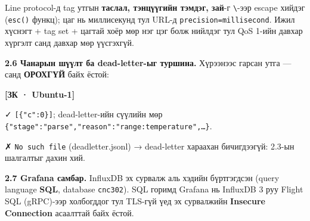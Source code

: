 Line protocol-д tag утгын \textbf{таслал, тэнцүүгийн тэмдэг, зай}-г \texttt{\textbackslash{}}-ээр escape хийдэг (\texttt{esc()} функц); цаг нь миллисекунд тул URL-д \texttt{precision=\allowbreak{}millisecond}. Ижил хүснэгт + tag set + цагтай хоёр мөр нэг цэг болж нийлдэг тул QoS 1-ийн давхар хүргэлт санд давхар мөр үүсгэхгүй.

\textbf{2.6 Чанарын шүүлт ба dead-letter-ыг туршина.} Хүрээнээс гарсан утга --- санд \textbf{ОРОХГҮЙ} байх ёстой:

\textbf{{[}ЗК · Ubuntu-1{]}}

\begin{Shaded}
\begin{Highlighting}[]
 \KeywordTok{\textbackslash{}}
   \VariableTok{$(}\VariableTok{)}
 \KeywordTok{\textbackslash{}}
   
\end{Highlighting}
\end{Shaded}

✓ \texttt{{[}\{"c":0\}{]}}; dead-letter-ийн сүүлийн мөр \texttt{\{"stage":\allowbreak{}"parse","reason":\allowbreak{}"range:\allowbreak{}temperature",\ldots{}\}}.

✗ \texttt{No\ such\ file} (deadletter.jsonl) → dead-letter хараахан бичигдээгүй: 2.3-ын шалгалтыг дахин хий.

\textbf{2.7 Grafana самбар.} InfluxDB эх сурвалж аль хэдийн бүртгэгдсэн (query language \textbf{SQL}, database \texttt{cnc302}). SQL горимд Grafana нь InfluxDB 3 руу Flight SQL (gRPC)-ээр холбогддог тул TLS-гүй үед эх сурвалжийн \textbf{Insecure Connection} асаалттай байх ёстой.

